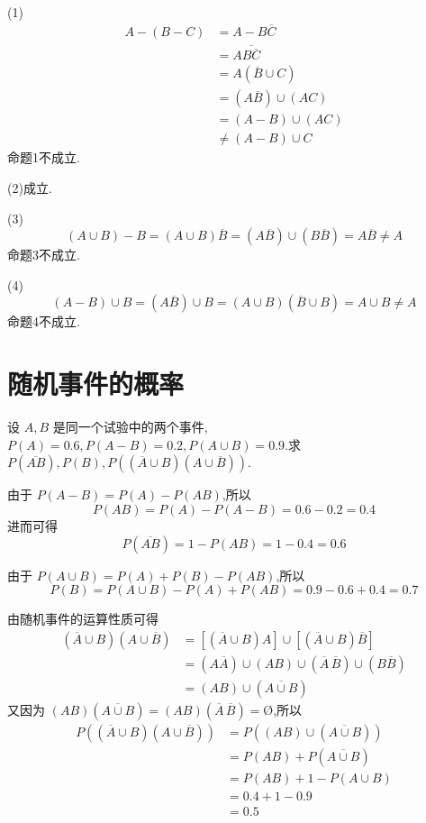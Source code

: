 \begin{solution}
    (1)
    $$
    \begin{aligned}
        A-(B-C) &= A - B \overline{C} \\
        &= A \overline{B \overline{C}} \\
        &= A (\overline{B} \cup C) \\
        &= (A \overline{B}) \cup (AC) \\
        &= (A-B) \cup (AC) \\
        & \not= (A-B) \cup C
    \end{aligned}
    $$
    命题1不成立.

    (2)成立.

    (3)
    $$
    (A \cup B) - B = (A \cup B) \overline{B} = (A \overline{B}) \cup (B \overline{B}) = A \overline{B} \not= A
    $$
    命题3不成立.

    (4)
    $$
    (A - B) \cup B = (A \overline{B}) \cup B = (A \cup B)(\overline{B} \cup B) = A \cup B \not= A
    $$
    命题4不成立.
\end{solution}

\section{随机事件的概率}

\question 设 $A,B$ 是同一个试验中的两个事件, $P(A)=0.6, P(A-B)=0.2, P(A \cup B) = 0.9$.求 $P(\overline{AB}), P(B), P((\overline{A} \cup B)(A \cup \overline{B}))$.

\begin{solution}
    由于 $P(A-B) = P(A) - P(AB)$,所以
    $$
    P(AB) = P(A) - P(A-B) = 0.6 - 0.2 = 0.4
    $$
    进而可得
    $$
    P(\overline{AB}) = 1 - P(AB) = 1 - 0.4 = 0.6
    $$

    由于 $P(A \cup B) = P(A) + P(B) - P(AB)$,所以
    $$
    P(B) = P(A \cup B) - P(A) + P(AB) = 0.9 - 0.6 + 0.4 = 0.7
    $$

    由随机事件的运算性质可得
    $$
    \begin{aligned}
        (\overline{A} \cup B)(A \cup \overline{B}) &= [(\overline{A} \cup B) A] \cup [(\overline{A} \cup B) \overline{B}] \\
        &= (A \overline{A}) \cup (AB) \cup (\overline{A} \, \overline{B}) \cup (B \overline{B}) \\
        &= (AB) \cup (\overline{A \cup B})
    \end{aligned}
    $$
    又因为 $(AB)(\overline{A \cup B}) = (AB)(\overline{A} \, \overline{B}) = \text{\O}$,所以
    $$
    \begin{aligned}
        P((\overline{A} \cup B)(A \cup \overline{B})) &= P((AB) \cup (\overline{A \cup B})) \\
        &= P(AB) + P(\overline{A \cup B}) \\
        &= P(AB) + 1 - P(A \cup B) \\
        &= 0.4 + 1 - 0.9 \\
        &= 0.5
    \end{aligned}
    $$
\end{solution}

